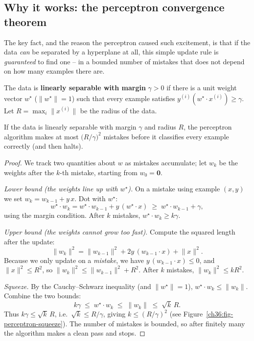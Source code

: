 \subsection{Why it works: the perceptron convergence theorem}

The key fact, and the reason the perceptron caused such excitement, is
that if the data \emph{can} be separated by a hyperplane at all, this simple
update rule is \emph{guaranteed} to find one -- in a bounded number of mistakes
that does not depend on how many examples there are.

\begin{formalbox}
The data is \textbf{linearly separable with margin} $\gamma > 0$ if there is a
unit weight vector $w^\star$ ($\lVert w^\star\rVert = 1$) such that every example
satisfies $y^{(i)}(w^\star\cdot x^{(i)}) \ge \gamma$. Let
$R = \max_i \lVert x^{(i)}\rVert$ be the radius of the data.
\end{formalbox}

\begin{theorem}
\label{ch36:thm-perceptron}
If the data is linearly separable with margin $\gamma$ and radius $R$, the
perceptron algorithm makes at most $\big(R/\gamma\big)^2$ mistakes before it
classifies every example correctly (and then halts).
\end{theorem}

\begin{proof}
We track two quantities about $w$ as mistakes accumulate; let $w_k$ be the
weights after the $k$-th mistake, starting from $w_0=\mathbf 0$.

\emph{Lower bound (the weights line up with $w^\star$).} On a mistake using
example $(x,y)$ we set $w_k = w_{k-1} + y\,x$. Dot with $w^\star$:
\[
  w^\star\cdot w_k = w^\star\cdot w_{k-1} + y\,(w^\star\cdot x)
  \;\ge\; w^\star\cdot w_{k-1} + \gamma,
\]
using the margin condition. After $k$ mistakes, $w^\star\cdot w_k \ge k\gamma$.

\emph{Upper bound (the weights cannot grow too fast).} Compute the squared
length after the update:
\[
  \lVert w_k\rVert^2 = \lVert w_{k-1}\rVert^2 + 2y\,(w_{k-1}\cdot x) + \lVert x\rVert^2 .
\]
Because we only update on a \emph{mistake}, we have $y\,(w_{k-1}\cdot x)\le 0$,
and $\lVert x\rVert^2 \le R^2$, so
$\lVert w_k\rVert^2 \le \lVert w_{k-1}\rVert^2 + R^2$. After $k$ mistakes,
$\lVert w_k\rVert^2 \le k R^2$.

\emph{Squeeze.} By the Cauchy--Schwarz inequality (and $\lVert w^\star\rVert=1$),
$w^\star\cdot w_k \le \lVert w_k\rVert$. Combine the two bounds:
\[
  k\gamma \;\le\; w^\star\cdot w_k \;\le\; \lVert w_k\rVert \;\le\; \sqrt{k}\,R .
\]
Thus $k\gamma \le \sqrt{k}\,R$, i.e.\ $\sqrt{k}\le R/\gamma$, giving
$k \le (R/\gamma)^2$ (see Figure~\ref{ch36:fig-perceptron-squeeze}). The number of mistakes is bounded, so after finitely many
the algorithm makes a clean pass and stops.
\end{proof}


